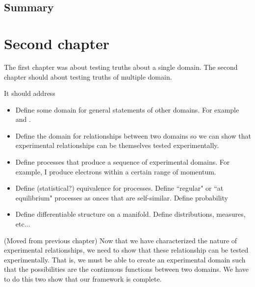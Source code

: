 \documentclass[11pt,letterpaper,fleqn]{memoir} %
\begin{document}
\section{Summary}

\chapter{Second chapter}

The first chapter was about testing truths about a single domain. The second chapter should about testing truths of multiple domain.

It should address
\begin{itemize}
	\item Define some domain for general statements of other domains. For example  and .
	\item Define the domain for relationships between two domains so we can show that experimental relationships can be themselves tested experimentally.
	\item Define processes that produce a sequence of experimental domains. For example, I produce electrons within a certain range of momentum.
	\item Define (statistical?) equivalence for processes. Define ``regular" or ``at equilibrium" processes as onces that are self-similar. Define probability
	\item Define differentiable structure on a manifold. Define distributions, measures, etc...
\end{itemize}

(Moved from previous chapter) Now that we have characterized the nature of experimental relationships, we need to show that these relationship can be tested experimentally. That is, we must be able to create an experimental domain such that the possibilities are the continuous functions between two domains. We have to do this two show that our framework is complete.
\end{document}
